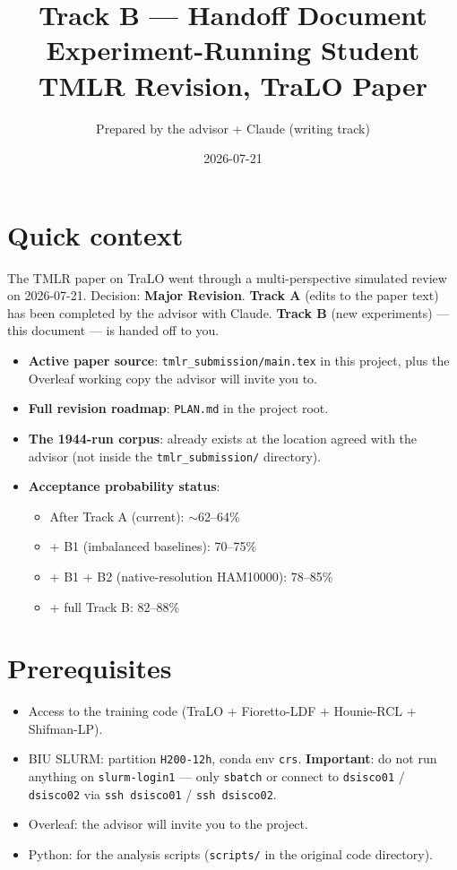 \documentclass[11pt,a4paper]{article}
\title{Track B --- Handoff Document\\[4pt]
       \large Experiment-Running Student\\[2pt]
       \normalsize TMLR Revision, TraLO Paper}
\author{Prepared by the advisor + Claude (writing track)}
\date{2026-07-21}
\newcommand{\code}[1]{\texttt{#1}}
\newcommand{\file}[1]{\texttt{#1}}
\begin{document}
\maketitle

\section*{Quick context}

The TMLR paper on TraLO went through a multi-perspective simulated review on
2026-07-21. Decision: \textbf{Major Revision}. \textbf{Track A} (edits to
the paper text) has been completed by the advisor with Claude. \textbf{Track
B} (new experiments) --- this document --- is handed off to you.

\begin{itemize}[nosep]
  \item \textbf{Active paper source}: \file{tmlr\_submission/main.tex} in
        this project, plus the Overleaf working copy the advisor will invite
        you to.
  \item \textbf{Full revision roadmap}: \file{PLAN.md} in the project root.
  \item \textbf{The 1944-run corpus}: already exists at the location agreed
        with the advisor (not inside the \file{tmlr\_submission/} directory).
  \item \textbf{Acceptance probability status}:
    \begin{itemize}[nosep]
      \item After Track A (current): $\sim$62--64\%
      \item + B1 (imbalanced baselines): 70--75\%
      \item + B1 + B2 (native-resolution HAM10000): 78--85\%
      \item + full Track B: 82--88\%
    \end{itemize}
\end{itemize}

\section*{Prerequisites}

\begin{itemize}[nosep]
  \item Access to the training code (TraLO + Fioretto-LDF + Hounie-RCL +
        Shifman-LP).
  \item BIU SLURM: partition \code{H200-12h}, conda env \code{crs}.
        \textbf{Important}: do not run anything on \code{slurm-login1} ---
        only \code{sbatch} or connect to \code{dsisco01} / \code{dsisco02}
        via \code{ssh dsisco01} / \code{ssh dsisco02}.
  \item Overleaf: the advisor will invite you to the project.
  \item Python: for the analysis scripts (\code{scripts/} in the original
        code directory).
\end{itemize}
\end{document}
